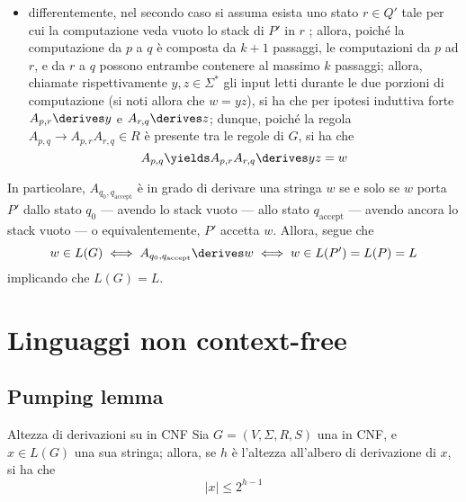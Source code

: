 \documentclass[a4paper, 12pt]{report}
\begin{document}
{\begin{enumerate}[label=]
\begin{enumerate}[label=]
\begin{itemize}
                                segue necessariamente che $y$ deve lasciare lo stack invariato anche'essa; questo dimostra che $y$ è dunque in grado di portare $P'$ dallo stato $r$ allo stato $s$ lasciando lo stack invariato; allora, poiché la porzione di computazione di $y$ è composta da $(k + 1) - 2 = k - 1$ passaggi, è possibile applicare su essa l'ipotesi induttiva forte, per la quale $A_{r,s} \derives y$; allora, poiché $A_{p,q} \to aA_{r,s}b \in R$ per costruzione di $G$, si ha che $$A_{p,q} \yields a A_{r,s}b \derives ayb = w \implies A_{p,q} \derives w$$
                            \item differentemente, nel secondo caso si assuma esista uno stato $r \in Q'$ tale per cui la computazione veda vuoto lo stack di $P'$ in $r$ ; allora, poiché la computazione da $p$ a $q$ è composta da $k + 1$ passaggi, le computazioni da $p$ ad $r$, e da $r$ a $q$ possono entrambe contenere al massimo $k$ passaggi; allora, chiamate rispettivamente $y, z \in \Sigma^*$ gli input letti durante le due porzioni di computazione (si noti allora che $w = yz$), si ha che per ipotesi induttiva forte $A_{p,r} \derives y$ e $A_{r,q} \derives z$; dunque, poiché la regola $A_{p,q} \to A_{p,r}A_{r,q} \in R$ è presente tra le regole di $G$, si ha che $$A_{p,q} \yields A_{p,r}A_{r,q} \derives yz = w$$
                        \end{itemize}
                \end{enumerate}
        \end{enumerate}

        In particolare, $A_{q_0, q_\mathrm{accept}}$ è in grado di derivare una stringa $w$ se e solo se $w$ porta $P'$ dallo stato $q_0$ --- avendo lo stack vuoto --- allo stato $q_\mathrm{accept}$ --- avendo ancora lo stack vuoto --- o equivalentemente, $P'$ accetta $w$. Allora, segue che $$w \in L(G) \iff A_{q_0, q_\mathrm{accept}} \derives w \iff w \in L(P') = L(P) = L$$ implicando che $L(G) = L$.
    }

    \section{Linguaggi non context-free}

    \subsection{Pumping lemma}

    \begin{framedprop}[label={prop pre pump cfl}]{Altezza di derivazioni su \CFG in CNF}
        Sia $G = (V, \Sigma, R, S)$ una \CFG in CNF, e $x \in L(G)$ una sua stringa; allora, se $h$ è l'altezza all'albero di derivazione di $x$, si ha che $$|x| \le 2^{h - 1}$$
    \end{framedprop}
\end{document}

